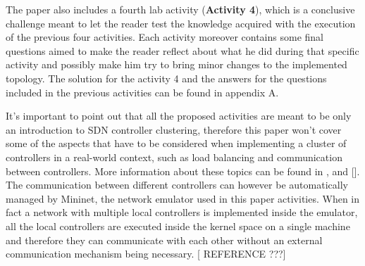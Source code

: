\documentclass[12pt, a4paper]{article}
\begin{document}
The paper also includes a fourth lab activity (\textbf{Activity 4}), which is a conclusive challenge meant
to let the reader test the knowledge acquired with the execution of the previous
four activities. Each activity moreover contains some final questions aimed to make the reader
reflect about what he did during that specific activity and possibly make him try to
bring minor changes to the implemented topology. The solution for the activity 4
and the answers for the questions included in the previous activities can be
found in appendix A.

It's important to point out that all the proposed activities are meant to be
only an introduction to SDN controller clustering, therefore this paper won't cover
some of the aspects that have to be considered when implementing a cluster of
controllers in a real-world context, such as load balancing and communication
between controllers. More information about these topics can be found in
\cite{ref-1}, \cite{ref-2} and [].
The communication between different controllers can however be automatically managed
by Mininet, the network emulator used in this paper activities. When in fact a
network with multiple local controllers is implemented inside the emulator, all
the local controllers are executed inside the kernel space on a single machine
and therefore they can communicate with each other without an external
communication mechanism being necessary. [ REFERENCE ???]






\end{document}

